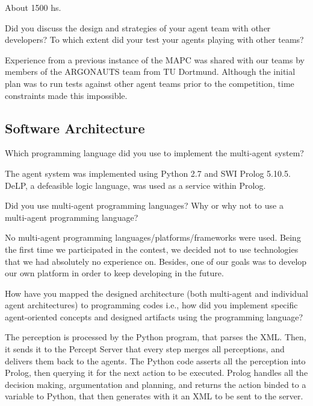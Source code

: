 About 1500 hs.

\begin{question}
Did you discuss the design and strategies of your agent team with other
developers? To which extent did your test your agents playing with other
teams?
\end{question}

Experience from a previous instance of the MAPC was shared with our
teams by members of the ARGONAUTS team from TU Dortmund. Although the
initial plan was to run tests against other agent teams prior to the
competition, time constraints made this impossible.

\subsection{Software Architecture}
\setcounter{question}{0}
\begin{question}
Which programming language did you use to
implement the multi-agent system?  
\end{question}

The agent system was implemented using
Python 2.7 and SWI Prolog 5.10.5. DeLP, a defeasible logic language, was used
as a service within Prolog.

\begin{question}
Did you use multi-agent programming languages? Why or why not to use a
multi-agent programming language?  
\end{question}

No multi-agent programming
languages/platforms/frameworks were used. Being the first time we participated
in the contest, we decided not to use technologies that we had absolutely no experience on. Besides,
one of our goals was to develop our own platform in order to keep developing in the future.

\begin{question}
How have you mapped the designed architecture (both multi-agent and
individual agent architectures) to programming codes i.e., how did you
implement specific agent-oriented concepts and designed artifacts using the
programming language?  
\end{question}

The perception is processed by the Python program, that
parses the XML. Then, it sends it to the Percept Server that every step merges
all perceptions, and delivers them back to the agents.  The Python code
asserts all the perception into Prolog, then querying it for the next action
to be executed.  Prolog handles all the decision making, argumentation and
planning, and returns the action binded to a variable to Python, that then
generates with it an XML to be sent to the server.

